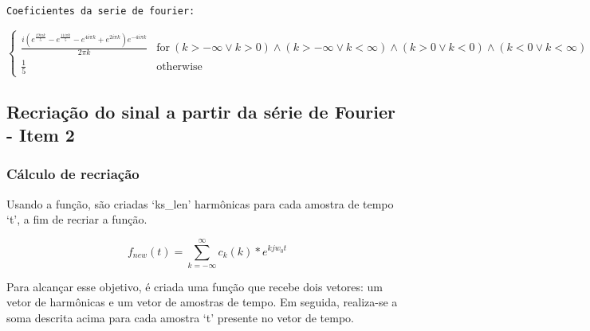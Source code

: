 \documentclass{article}
\begin{document}
    \begin{Verbatim}[commandchars=\\\{\}]
Coeficientes da serie de fourier:
    \end{Verbatim}

    $\displaystyle \begin{cases} \frac{i \left(e^{\frac{19 i \pi k}{5}} - e^{\frac{11 i \pi k}{5}} - e^{4 i \pi k} + e^{2 i \pi k}\right) e^{- 4 i \pi k}}{2 \pi k} & \text{for}\: \left(k > -\infty \vee k > 0\right) \wedge \left(k > -\infty \vee k < \infty\right) \wedge \left(k > 0 \vee k < 0\right) \wedge \left(k < 0 \vee k < \infty\right) \\\frac{1}{5} & \text{otherwise} \end{cases}$

    
    \hypertarget{recriauxe7uxe3o-do-sinal-a-partir-da-suxe9rie-de-fourier---item-2}{%
\subsection{Recriação do sinal a partir da série de Fourier - Item
2}\label{recriauxe7uxe3o-do-sinal-a-partir-da-suxe9rie-de-fourier---item-2}}

    \hypertarget{cuxe1lculo-de-recriauxe7uxe3o}{%
\subsubsection{Cálculo de
recriação}\label{cuxe1lculo-de-recriauxe7uxe3o}}

Usando a função, são criadas `ks\_len' harmônicas para cada amostra de
tempo `t', a fim de recriar a função.

\[ 
f_{new}(t) =
\sum_{k = -\infty}^{\infty}
c_k(k) * e^{k j w_0 t}
\]

Para alcançar esse objetivo, é criada uma função que recebe dois
vetores: um vetor de harmônicas e um vetor de amostras de tempo. Em
seguida, realiza-se a soma descrita acima para cada amostra `t' presente
no vetor de tempo.
\end{document}
